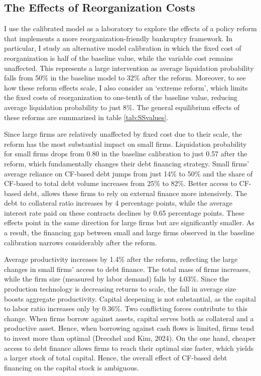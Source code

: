 \documentclass[12pt]{article}
\begin{document}
\subsection{The Effects of Reorganization Costs}
I use the calibrated model as a laboratory to explore the effects of a policy reform that implements a more reorganization-friendly bankruptcy framework. In particular, I study an alternative model calibration in which the fixed cost of reorganization is half of the baseline value, while the variable cost remains unaffected. This represents a large intervention as average liquidation probability falls from 50\% in the baseline model to 32\% after the reform. Moreover, to see how these reform effects scale, I also consider an `extreme reform', which limits the fixed costs of reorganization to one-tenth of the baseline value, reducing average liquidation probability to just 8\%. The general equilibrium effects of these reforms are summarized in table \ref{tab:SSvalues}. 
 
Since large firms are relatively unaffected by fixed cost due to their scale, the reform has the most substantial impact on small firms. Liquidation probability for small firms drops from 0.80 in the baseline calibration to just 0.57 after the reform, which fundamentally changes their debt financing strategy. Small firms' average reliance on CF-based debt jumps from just 14\% to 50\% and the share of CF-based to total debt volume increases from 25\% to 82\%. Better access to CF-based debt, allows these firms to rely on external finance more intensively. The debt to collateral ratio increases by 4 percentage points, while the average interest rate paid on these contracts declines by 0.65 percentage points. These effects point in the same direction for large firms but are significantly smaller. As a result, the financing gap between small and large firms observed in the baseline calibration narrows considerably after the reform. 
 
Average productivity increases by 1.4\% after the reform, reflecting the large changes in small firms' access to debt finance. The total mass of firms increases, while the firm size (measured by labor demand) falls by 4.03\%. Since the production technology is decreasing returns to scale, the fall in average size boosts aggregate productivity. Capital deepening is not substantial, as the capital to labor ratio increases only by 0.36\%. Two conflicting forces contribute to this change. When firms borrow against assets, capital serves both as collateral and a productive asset. Hence, when borrowing against cash flows is limited, firms tend to invest more than optimal (Drecshel and Kim, 2024). On the one hand, cheaper access to debt finance allows firms to reach their optimal size faster, which yields a larger stock of total capital. Hence, the overall effect of CF-based debt financing on the capital stock is ambiguous.
\end{document}
